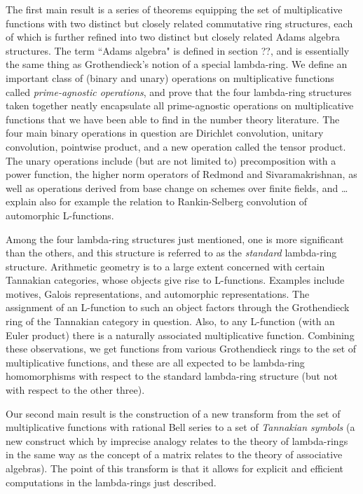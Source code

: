 \documentclass[a4paper]{article}
\theoremstyle{definition}
\theoremstyle{remark}
\begin{document}
The first main result is a series of theorems equipping the set of multiplicative functions with two distinct but closely related commutative ring structures, each of which is further refined into two distinct but closely related Adams algebra structures. The term ``Adams algebra" is defined in section ??, and is essentially the same thing as Grothendieck's notion of a special lambda-ring. We define an important class of (binary and unary) operations on multiplicative functions called \emph{prime-agnostic operations}, and prove that the four lambda-ring structures taken together neatly encapsulate all prime-agnostic operations on multiplicative functions that we have been able to find in the number theory literature. The four main binary operations in question are Dirichlet convolution, unitary convolution, pointwise product, and a new operation called the tensor product. The unary operations include (but are not limited to) precomposition with a power function, the higher norm operators of Redmond and Sivaramakrishnan, as well as operations derived from base change on schemes over finite fields, and \ldots explain also for example the relation to Rankin-Selberg convolution of automorphic L-functions.

Among the four lambda-ring structures just mentioned, one is more significant than the others, and this structure is referred to as the \emph{standard} lambda-ring structure. Arithmetic geometry is to a large extent concerned with certain Tannakian categories, whose objects give rise to L-functions. Examples include motives, Galois representations, and automorphic representations. The assignment of an L-function to such an object factors through the Grothendieck ring of the Tannakian category in question. Also, to any L-function (with an Euler product) there is a naturally associated multiplicative function. Combining these observations, we get functions from various Grothendieck rings to the set of multiplicative functions, and these are all expected to be lambda-ring homomorphisms with respect to the standard lambda-ring structure (but not with respect to the other three). 

Our second main result is the construction of a new transform from the set of multiplicative functions with rational Bell series to a set of \emph{Tannakian symbols} (a new construct which by imprecise analogy relates to the theory of lambda-rings in the same way as the concept of a matrix relates to the theory of associative algebras). The point of this transform is that it allows for explicit and efficient computations in the lambda-rings just described.
\end{document}
